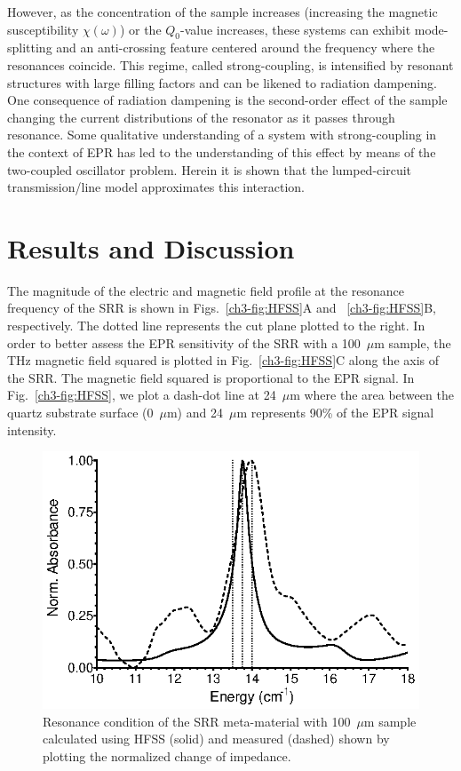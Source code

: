 However, as the concentration of the sample increases (increasing the magnetic susceptibility $\chi(\omega)$) or the $Q_0$-value increases, these systems can exhibit mode-splitting and an anti-crossing feature centered around the frequency where the resonances coincide. This regime, called strong-coupling, is intensified by resonant structures with large filling factors and can be likened to radiation dampening. \cite{BloembergenRadDamp, BloomRadDamp, MeiboomRadDamp} One consequence of radiation dampening is the second-order effect of the sample changing the current distributions of the resonator as it passes through resonance. Some qualitative understanding of a system with strong-coupling in the context of EPR has led to the understanding of this effect by means of the two-coupled oscillator problem. \cite{SchneiderEPR,BOERO2013133} Herein it is shown that the lumped-circuit transmission\-/line model approximates this interaction. 

\section{Results and Discussion}
The magnitude of the electric and magnetic field profile at the resonance frequency of the SRR is shown in Figs.~\ref{ch3-fig:HFSS}A and ~\ref{ch3-fig:HFSS}B, respectively. The dotted line represents the cut plane plotted to the right. In order to better assess the EPR sensitivity of the SRR with a 100~$\mu$m sample, the THz magnetic field squared is plotted in Fig.~\ref{ch3-fig:HFSS}C along the axis of the SRR. The magnetic field squared is proportional to the EPR signal. In Fig.~\ref{ch3-fig:HFSS}, we plot a dash-dot line at 24~$\mu$m where the area between the quartz substrate surface (0~$\mu$m) and 24~$\mu$m represents 90\% of the EPR signal intensity.

\begin{figure}[htp]\centering
  \includegraphics{Kapitel/Ch3-Images/03-SRR_Profile.eps}%
  \caption[Simulated and measured SRR resonance.]{Resonance condition of the SRR meta-material with 100~$\mu$m sample calculated using HFSS (solid) and measured (dashed) shown by plotting the normalized change of impedance.}
  \label{ch3-fig:resonator}
\end{figure}

